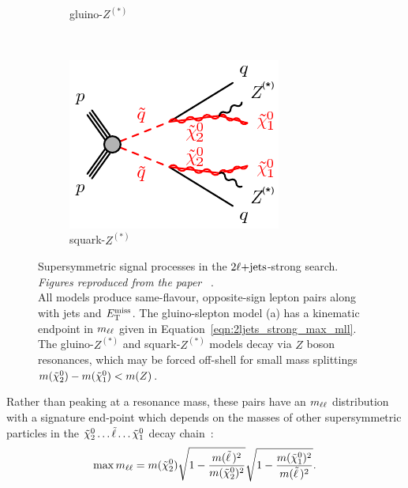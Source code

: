 \begin{figure}[tp]
\begin{subfigure}{0.47\textwidth}
    \caption{gluino-$Z^{(*)}$}
\end{subfigure}
\\[0.5em]
\begin{subfigure}{0.45\textwidth}
    \centering
    \includegraphics[width=\textwidth]{figures/2ljets_strong_sqsq_qqZZN1N1.pdf}
    \caption{squark-$Z^{(*)}$}
\end{subfigure}
\caption{%
Supersymmetric signal processes in the $2\ell\mathrm{+jets}$-strong search.
\emph{Figures reproduced from the paper%
}~\cite{atlas2022searches, atlas_susy_feynman}.
\\[0.5em]
All models produce same-flavour, opposite-sign lepton pairs along with jets
and $E_\mathrm{T}^\mathrm{miss}$.
The gluino-slepton model (a) has a kinematic endpoint in $m_{\ell\ell}$
given in Equation~\ref{eqn:2ljets_strong_max_mll}.
The gluino-$Z^{(*)}$ and squark-$Z^{(*)}$ models decay via $Z$ boson
resonances, which may be forced off-shell for small mass splittings
$m(\tilde\chi^0_2) - m(\tilde\chi^0_1) < m(Z)$.
}
\label{fig:2ljets_strong_signal_diagrams}
\end{figure}

Rather than peaking at a resonance mass, these pairs have an $m_{\ell\ell}$
distribution with a signature end-point which depends on the masses of other
supersymmetric particles in the
$\tilde\chi^0_2 \ldots \tilde\ell \ldots \tilde\chi^0_1$
decay chain~\cite{paige1996determining}:
\begin{equation}
\label{eqn:2ljets_strong_max_mll}
\max m_{\ell\ell}
= m(\tilde\chi^0_2)
\sqrt{1 - \frac{m(\tilde\ell\,)^2}{m(\tilde\chi^0_2)^2}}
\sqrt{1 - \frac{m(\tilde\chi^0_1)^2}{m(\tilde\ell\,)^2}}
.
\end{equation}

